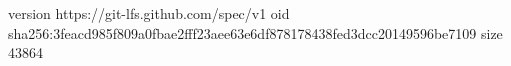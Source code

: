 version https://git-lfs.github.com/spec/v1
oid sha256:3feacd985f809a0fbae2fff23aee63e6df878178438fed3dcc20149596be7109
size 43864
